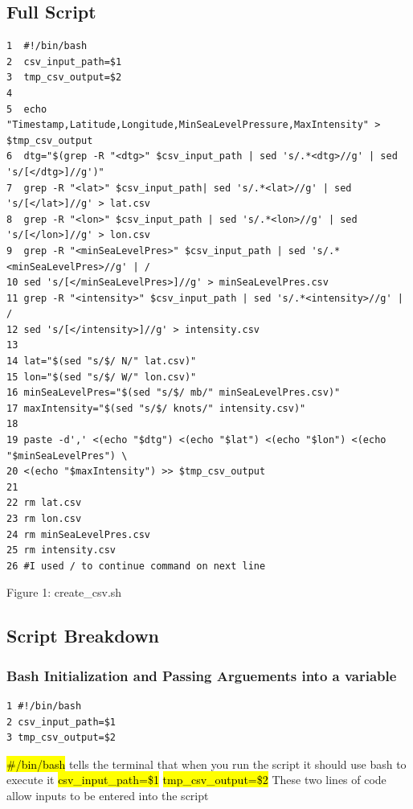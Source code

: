 \documentclass[]{article}
\begin{document}
\subsection{Full Script}
\begin{tcolorbox}[colback=white, colframe=black, boxrule=1pt, arc=2mm, 
    title=create\_csv.sh, width=6.7in, fonttitle=\bfseries, listing only, listing options={language=sh, basicstyle=\ttfamily}]
\begin{verbatim}
1  #!/bin/bash
2  csv_input_path=$1
3  tmp_csv_output=$2
4
5  echo "Timestamp,Latitude,Longitude,MinSeaLevelPressure,MaxIntensity" > $tmp_csv_output
6  dtg="$(grep -R "<dtg>" $csv_input_path | sed 's/.*<dtg>//g' | sed 's/[</dtg>]//g')"
7  grep -R "<lat>" $csv_input_path| sed 's/.*<lat>//g' | sed 's/[</lat>]//g' > lat.csv
8  grep -R "<lon>" $csv_input_path | sed 's/.*<lon>//g' | sed 's/[</lon>]//g' > lon.csv
9  grep -R "<minSeaLevelPres>" $csv_input_path | sed 's/.*<minSeaLevelPres>//g' | /
10 sed 's/[</minSeaLevelPres>]//g' > minSeaLevelPres.csv
11 grep -R "<intensity>" $csv_input_path | sed 's/.*<intensity>//g' | / 
12 sed 's/[</intensity>]//g' > intensity.csv
13 
14 lat="$(sed "s/$/ N/" lat.csv)"
15 lon="$(sed "s/$/ W/" lon.csv)"
16 minSeaLevelPres="$(sed "s/$/ mb/" minSeaLevelPres.csv)"
17 maxIntensity="$(sed "s/$/ knots/" intensity.csv)"
18
19 paste -d',' <(echo "$dtg") <(echo "$lat") <(echo "$lon") <(echo "$minSeaLevelPres") \
20 <(echo "$maxIntensity") >> $tmp_csv_output
21
22 rm lat.csv
23 rm lon.csv
24 rm minSeaLevelPres.csv
25 rm intensity.csv
26 #I used / to continue command on next line
\end{verbatim}
\end{tcolorbox}
\begin{center}
    Figure 1: create\_csv.sh
\end{center}

\subsection{Script Breakdown}
\subsubsection{Bash Initialization and Passing Arguements into a variable}
\begin{tcolorbox}[colback=white, colframe=black, boxrule=1pt, arc=2mm, 
    title=Bash Initialization and Passing Arguements into a variable, width=6.7in, fonttitle=\bfseries, listing only, listing options={language=sh, basicstyle=\ttfamily}]
    \begin{verbatim}
1 #!/bin/bash
2 csv_input_path=$1
3 tmp_csv_output=$2
    \end{verbatim}
\hl{\#\!/bin/bash}\newline
tells the terminal that when you run the script it should use bash to execute it\newline
\hl{csv\_input\_path=\$1}\newline
\hl{tmp\_csv\_output=\$2}\newline
These two lines of code allow inputs to be entered into the script
\end{tcolorbox}
\end{document}
